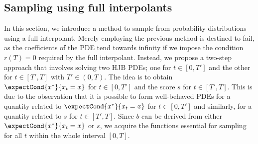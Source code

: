 \iffalse
\begin{remark}\label{remark:oc_approach}
We remark that $\nabla u$ could a priori be obtained as a solution to an optimization problem. In particular, let $u$ be the solution to PDE (\ref{eqn:velocity_pde}) and for an $m\in C^1([0,T]\times\R^d,\R^d)$ let the process $X_t$ be generated by the SDE $dX_t = \left(\sigma^2 m(t,X_t)+\mu(t,X_t)\right)dt+\sigma(t) dW_t$. Then, we have 
\begin{equation}\label{eqn:oc_optimization}
    \nabla u = \argmin{m} \expectCond{\frac{1}{2}\int_0^T\sigma^2(t)\norm{m(s,X_s)}^2ds-\varphi(X_T)}{X_0}.
\end{equation}
Typically, $m$ is parameterized by a neural network, and its parameters are learned by solving the minimization problem in (\ref{eqn:oc_optimization}). However, observe that the domain over which the function $\nabla u$ is learned depends on the distribution of the diffusion process $X_t$ for the optimal $m$. In our case, this presents issues since the diffusion process employed for sampling (\ref{eqn:SDEforSampling}) is different from $X_t$. Hence, if solved using the optimal control approach, $\nabla u$ would be learned over a domain that differs from what is required.
\end{remark}
\fi

\subsection{Sampling using full interpolants}\label{sec:full_interpolant}
In this section, we introduce a method to sample from probability distributions using a full interpolant. Merely employing the previous method is destined to fail, as the coefficients of the PDE tend towards infinity if we impose the condition $r(T)=0$ required by the full interpolant.  Instead, we propose a two-step approach that involves solving two HJB PDEs; one for $t\in[0,T']$ and the other for $t\in[T',T]$ with $T'\in(0,T)$. The idea is to obtain $\expectCond{x^*}{x_t=x}$ for $t\in[0,T']$ and the score $s$ for $t\in[T',T]$. This is due to the observation that it is possible to form well-behaved PDEs for a quantity related to $\expectCond{x^*}{x_t=x}$ for $t\in[0,T']$ and similarly, for a quantity related to $s$ for $t\in[T',T]$. Since $b$ can be derived from either $\expectCond{x^*}{x_t=x}$ or $s$, we acquire the functions essential for sampling for all $t$ within the whole interval $[0,T]$.

